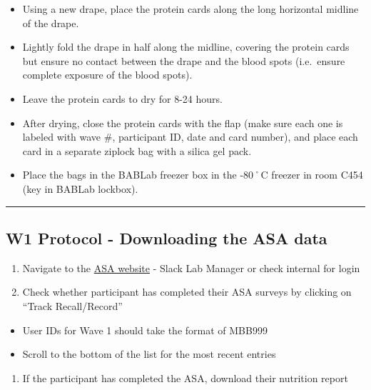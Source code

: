 \documentclass[
]{book}
\providecommand{\tightlist}{%
  \setlength{\itemsep}{0pt}\setlength{\parskip}{0pt}}
\begin{document}
\begin{itemize}
\tightlist
\item
  Using a new drape, place the protein cards along the long horizontal midline of the drape.
\item
  Lightly fold the drape in half along the midline, covering the protein cards but ensure no contact between the drape and the blood spots (i.e.~ensure complete exposure of the blood spots).
\item
  Leave the protein cards to dry for 8-24 hours.
\item
  After drying, close the protein cards with the flap (make sure each one is labeled with wave \#, participant ID, date and card number), and place each card in a separate ziplock bag with a silica gel pack.
\item
  Place the bags in the BABLab freezer box in the -80˚C freezer in room C454 (key in BABLab lockbox).
\end{itemize}

\begin{center}\rule{0.5\linewidth}{0.5pt}\end{center}

\hypertarget{w1-protocol---downloading-the-asa-data}{%
\subsection{W1 Protocol - Downloading the ASA data}\label{w1-protocol---downloading-the-asa-data}}

\begin{enumerate}
\def\labelenumi{\arabic{enumi}.}
\tightlist
\item
  Navigate to the \href{https://asa24.nci.nih.gov}{ASA website} - Slack Lab Manager or check internal for login
\item
  Check whether participant has completed their ASA surveys by clicking on ``Track Recall/Record''
\end{enumerate}

\begin{itemize}
\tightlist
\item
  User IDs for Wave 1 should take the format of MBB999
\item
  Scroll to the bottom of the list for the most recent entries
\end{itemize}

\begin{enumerate}
\def\labelenumi{\arabic{enumi}.}
\setcounter{enumi}{2}
\tightlist
\item
  If the participant has completed the ASA, download their nutrition report
\end{enumerate}
\end{document}

